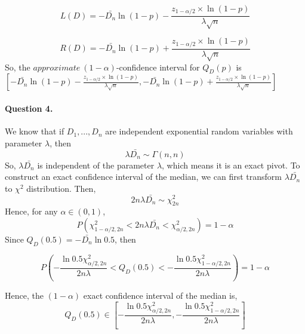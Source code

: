 \documentclass[
]{article}
\begin{document}
\[L(D)=-\bar{D_n}\ln{(1-p)}-\frac{z_{1-\alpha/2}\times\ln{(1-p)}}{\lambda\sqrt{n}}\]

\[R(D)=-\bar{D_n}\ln{(1-p)}+\frac{z_{1-\alpha/2}\times\ln{(1-p)}}{\lambda\sqrt{n}}\]
So, the \(approximate\ (1-\alpha)\)-confidence interval for \(Q_D(p)\)
is
\([-\bar{D_n}\ln{(1-p)}-\frac{z_{1-\alpha/2}\times\ln{(1-p)}}{\lambda\sqrt{n}},-\bar{D_n}\ln{(1-p)}+\frac{z_{1-\alpha/2}\times\ln{(1-p)}}{\lambda\sqrt{n}}]\)

\hypertarget{question-4.}{%
\paragraph{Question 4.}\label{question-4.}}

We know that if \(D_1,...,D_n\) are independent exponential random
variables with parameter \(\lambda\), then
\[\lambda\bar{D_n}\sim \Gamma(n,n)\] So, \(\lambda\bar{D_n}\) is
independent of the parameter \(\lambda\), which means it is an exact
pivot. To construct an exact confidence interval of the median, we can
first transform \(\lambda\bar{D_n}\) to \(\chi^2\) distribution. Then,
\[2n\lambda\bar{D_n}\sim \chi^2_{2n}\] Hence, for any
\(\alpha\in(0,1)\),
\[P(\chi^2_{1-\alpha/2,2n}<2n\lambda\bar{D_n}<\chi^2_{\alpha/2,2n})=1-\alpha\]
Since \(Q_D(0.5)=-\bar{D_n}\ln{0.5}\), then

\[P(-\frac{\ln{0.5}\chi^2_{\alpha/2,2n}}{2n\lambda}<Q_D(0.5)<-\frac{\ln{0.5}\chi^2_{1-\alpha/2,2n}}{2n\lambda})=1-\alpha\]

Hence, the \((1-\alpha)\) exact confidence interval of the median is,
\[Q_D(0.5)\in[-\frac{\ln{0.5}\chi^2_{\alpha/2,2n}}{2n\lambda},-\frac{\ln{0.5}\chi^2_{1-\alpha/2,2n}}{2n\lambda}]\]
\end{document}
